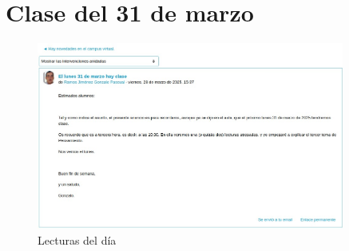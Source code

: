 \documentclass[12pt, a4paper, twoside]{article}
\begin{document}
\section{Clase del 31 de marzo} 
\begin{figure}[h]
    \centering
    \includegraphics[width=0.9\textwidth]{./Images/0331.jpg}
    \caption{Lecturas del día}
\end{figure}
\end{document}
